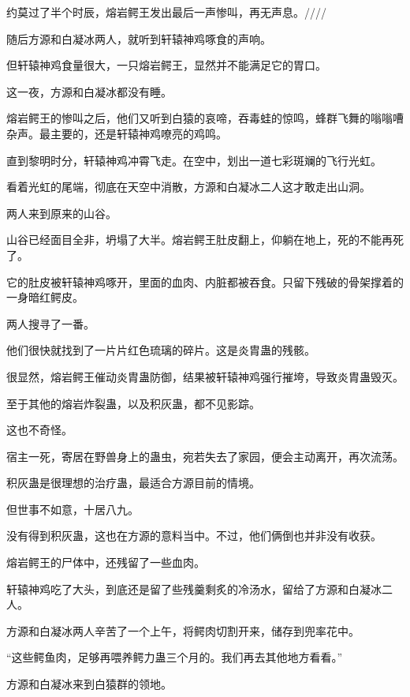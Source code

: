 
\begin{this_body}



约莫过了半个时辰，熔岩鳄王发出最后一声惨叫，再无声息。////

随后方源和白凝冰两人，就听到轩辕神鸡啄食的声响。

但轩辕神鸡食量很大，一只熔岩鳄王，显然并不能满足它的胃口。

这一夜，方源和白凝冰都没有睡。

熔岩鳄王的惨叫之后，他们又听到白猿的哀啼，吞毒蛙的惊鸣，蜂群飞舞的嗡嗡嘈杂声。最主要的，还是轩辕神鸡嘹亮的鸡鸣。

直到黎明时分，轩辕神鸡冲霄飞走。在空中，划出一道七彩斑斓的飞行光虹。

看着光虹的尾端，彻底在天空中消散，方源和白凝冰二人这才敢走出山洞。

两人来到原来的山谷。

山谷已经面目全非，坍塌了大半。熔岩鳄王肚皮翻上，仰躺在地上，死的不能再死了。

它的肚皮被轩辕神鸡啄开，里面的血肉、内脏都被吞食。只留下残破的骨架撑着的一身暗红鳄皮。

两人搜寻了一番。

他们很快就找到了一片片红色琉璃的碎片。这是炎胄蛊的残骸。

很显然，熔岩鳄王催动炎胄蛊防御，结果被轩辕神鸡强行摧垮，导致炎胄蛊毁灭。

至于其他的熔岩炸裂蛊，以及积灰蛊，都不见影踪。

这也不奇怪。

宿主一死，寄居在野兽身上的蛊虫，宛若失去了家园，便会主动离开，再次流荡。

积灰蛊是很理想的治疗蛊，最适合方源目前的情境。

但世事不如意，十居八九。

没有得到积灰蛊，这也在方源的意料当中。不过，他们俩倒也并非没有收获。

熔岩鳄王的尸体中，还残留了一些血肉。

轩辕神鸡吃了大头，到底还是留了些残羹剩炙的冷汤水，留给了方源和白凝冰二人。

方源和白凝冰两人辛苦了一个上午，将鳄肉切割开来，储存到兜率花中。

“这些鳄鱼肉，足够再喂养鳄力蛊三个月的。我们再去其他地方看看。”

方源和白凝冰来到白猿群的领地。


\end{this_body}
